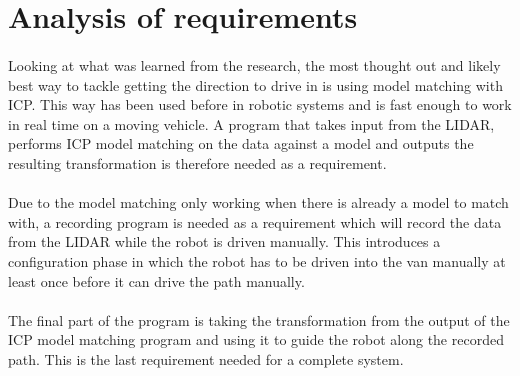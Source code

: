 \section{Analysis of requirements}
%
%
%
\paragraph{}
Looking at what was learned from the research, the most thought out and likely best way to tackle getting the direction to drive in is using model matching with ICP. This way has been used before in robotic systems and is fast enough to work in real time on a moving vehicle. A program that takes input from the LIDAR, performs ICP model matching on the data against a model and outputs the resulting transformation is therefore needed as a requirement.
\paragraph{}
Due to the model matching only working when there is already a model to match with, a recording program is needed as a requirement which will record the data from the LIDAR while the robot is driven manually. This introduces a configuration phase in which the robot has to be driven into the van manually at least once before it can drive the path manually.
\paragraph{}
The final part of the program is taking the transformation from the output of the ICP model matching program and using it to guide the robot along the recorded path. This is the last requirement needed for a complete system.

